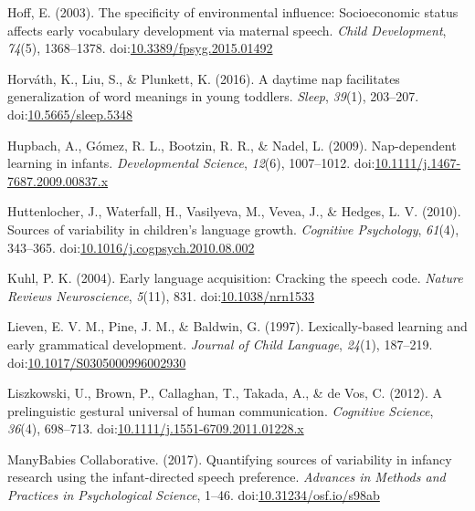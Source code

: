 \documentclass[floatsintext,man]{apa6}
\theoremstyle{definition}
\theoremstyle{definition}
\theoremstyle{definition}
\theoremstyle{remark}
\begin{document}
\hypertarget{ref-hoff2003specificity}{}
Hoff, E. (2003). The specificity of environmental influence:
Socioeconomic status affects early vocabulary development via maternal
speech. \emph{Child Development}, \emph{74}(5), 1368--1378.
doi:\href{https://doi.org/10.3389/fpsyg.2015.01492}{10.3389/fpsyg.2015.01492}

\hypertarget{ref-horvath2016daytime}{}
Horváth, K., Liu, S., \& Plunkett, K. (2016). A daytime nap facilitates
generalization of word meanings in young toddlers. \emph{Sleep},
\emph{39}(1), 203--207.
doi:\href{https://doi.org/10.5665/sleep.5348}{10.5665/sleep.5348}

\hypertarget{ref-hupbach2009nap}{}
Hupbach, A., Gómez, R. L., Bootzin, R. R., \& Nadel, L. (2009).
Nap-dependent learning in infants. \emph{Developmental Science},
\emph{12}(6), 1007--1012.
doi:\href{https://doi.org/10.1111/j.1467-7687.2009.00837.x}{10.1111/j.1467-7687.2009.00837.x}

\hypertarget{ref-huttenlocher2010sources}{}
Huttenlocher, J., Waterfall, H., Vasilyeva, M., Vevea, J., \& Hedges, L.
V. (2010). Sources of variability in children's language growth.
\emph{Cognitive Psychology}, \emph{61}(4), 343--365.
doi:\href{https://doi.org/10.1016/j.cogpsych.2010.08.002}{10.1016/j.cogpsych.2010.08.002}

\hypertarget{ref-kuhl2004early}{}
Kuhl, P. K. (2004). Early language acquisition: Cracking the speech
code. \emph{Nature Reviews Neuroscience}, \emph{5}(11), 831.
doi:\href{https://doi.org/10.1038/nrn1533}{10.1038/nrn1533}

\hypertarget{ref-lieven1997lexically}{}
Lieven, E. V. M., Pine, J. M., \& Baldwin, G. (1997). Lexically-based
learning and early grammatical development. \emph{Journal of Child
Language}, \emph{24}(1), 187--219.
doi:\href{https://doi.org/10.1017/S0305000996002930}{10.1017/S0305000996002930}

\hypertarget{ref-liszkowski2012prelinguistic}{}
Liszkowski, U., Brown, P., Callaghan, T., Takada, A., \& de Vos, C.
(2012). A prelinguistic gestural universal of human communication.
\emph{Cognitive Science}, \emph{36}(4), 698--713.
doi:\href{https://doi.org/10.1111/j.1551-6709.2011.01228.x}{10.1111/j.1551-6709.2011.01228.x}

\hypertarget{ref-manybabies2017}{}
ManyBabies Collaborative. (2017). Quantifying sources of variability in
infancy research using the infant-directed speech preference.
\emph{Advances in Methods and Practices in Psychological Science},
1--46.
doi:\href{https://doi.org/10.31234/osf.io/s98ab}{10.31234/osf.io/s98ab}
\end{document}
